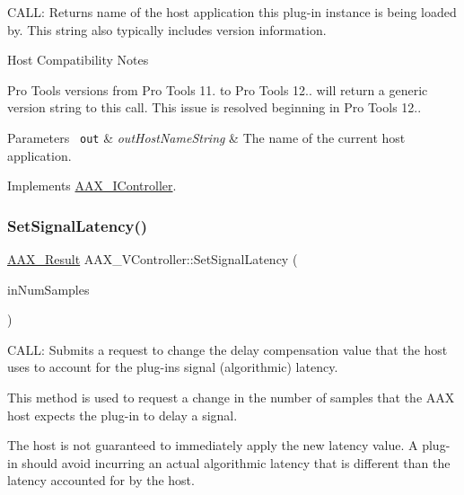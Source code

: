 C\+A\+LL\+: Returns name of the host application this plug-\/in instance is being loaded by. This string also typically includes version information. 

\begin{DoxyRefDesc}{Host Compatibility Notes}
\item[\mbox{\hyperlink{a00786__compatibility_notes000058}{Host Compatibility Notes}}]Pro Tools versions from Pro Tools 11. to Pro Tools 12.. will return a generic version string to this call. This issue is resolved beginning in Pro Tools 12..\end{DoxyRefDesc}



\begin{DoxyParams}[1]{Parameters}
\mbox{\texttt{ out}}  & {\em out\+Host\+Name\+String} & The name of the current host application. \\
\hline
\end{DoxyParams}


Implements \mbox{\hyperlink{a01789_ad2a002a133491b2ed572054588641e78}{A\+A\+X\+\_\+\+I\+Controller}}.

\mbox{\label{a01905_a6b4b924c94871b76a3bfdc7697384722}} 
\subsubsection{\texorpdfstring{SetSignalLatency()}{SetSignalLatency()}}
{\footnotesize\ttfamily \mbox{\hyperlink{a00392_a4d8f69a697df7f70c3a8e9b8ee130d2f}{A\+A\+X\+\_\+\+Result}} A\+A\+X\+\_\+\+V\+Controller\+::\+Set\+Signal\+Latency (\begin{DoxyParamCaption}\item[{int32\+\_\+t}]{in\+Num\+Samples }\end{DoxyParamCaption})\hspace{0.3cm}{\ttfamily [virtual]}}



C\+A\+LL\+: Submits a request to change the delay compensation value that the host uses to account for the plug-\/in\textquotesingle{}s signal (algorithmic) latency. 

This method is used to request a change in the number of samples that the A\+AX host expects the plug-\/in to delay a signal.

The host is not guaranteed to immediately apply the new latency value. A plug-\/in should avoid incurring an actual algorithmic latency that is different than the latency accounted for by the host.

